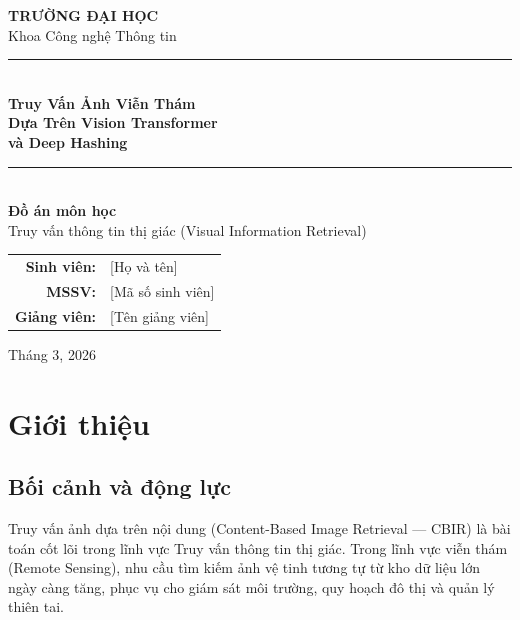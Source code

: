 \documentclass[13pt,a4paper]{article}
\begin{document}
\begin{titlepage}
\centering
\vspace*{1cm}

{\Large\textbf{TRƯỜNG ĐẠI HỌC}}\\[0.3cm]
{\large Khoa Công nghệ Thông tin}\\[2cm]

\rule{\textwidth}{1.5pt}\\[0.5cm]
{\Huge\bfseries Truy Vấn Ảnh Viễn Thám\\[0.3cm]
Dựa Trên Vision Transformer\\[0.3cm]
và Deep Hashing}\\[0.5cm]
\rule{\textwidth}{1.5pt}\\[1.5cm]

{\Large\textbf{Đồ án môn học}}\\[0.3cm]
{\large Truy vấn thông tin thị giác (Visual Information Retrieval)}\\[2cm]

\begin{tabular}{rl}
\textbf{Sinh viên:}   & [Họ và tên] \\
\textbf{MSSV:}        & [Mã số sinh viên] \\
\textbf{Giảng viên:}  & [Tên giảng viên] \\
\end{tabular}

\vfill
{\large Tháng 3, 2026}
\end{titlepage}

\newpage
\tableofcontents
\newpage
\listoftables
\listoffigures
\newpage

\section{Giới thiệu}

\subsection{Bối cảnh và động lực}

Truy vấn ảnh dựa trên nội dung (Content-Based Image Retrieval --- CBIR) là bài toán cốt lõi trong lĩnh vực Truy vấn thông tin thị giác. Trong lĩnh vực viễn thám (Remote Sensing), nhu cầu tìm kiếm ảnh vệ tinh tương tự từ kho dữ liệu lớn ngày càng tăng, phục vụ cho giám sát môi trường, quy hoạch đô thị và quản lý thiên tai.
\end{document}
